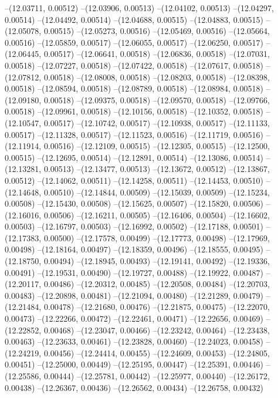 --(12.03711, 0.00512)
--(12.03906, 0.00513)
--(12.04102, 0.00513)
--(12.04297, 0.00514)
--(12.04492, 0.00514)
--(12.04688, 0.00515)
--(12.04883, 0.00515)
--(12.05078, 0.00515)
--(12.05273, 0.00516)
--(12.05469, 0.00516)
--(12.05664, 0.00516)
--(12.05859, 0.00517)
--(12.06055, 0.00517)
--(12.06250, 0.00517)
--(12.06445, 0.00517)
--(12.06641, 0.00518)
--(12.06836, 0.00518)
--(12.07031, 0.00518)
--(12.07227, 0.00518)
--(12.07422, 0.00518)
--(12.07617, 0.00518)
--(12.07812, 0.00518)
--(12.08008, 0.00518)
--(12.08203, 0.00518)
--(12.08398, 0.00518)
--(12.08594, 0.00518)
--(12.08789, 0.00518)
--(12.08984, 0.00518)
--(12.09180, 0.00518)
--(12.09375, 0.00518)
--(12.09570, 0.00518)
--(12.09766, 0.00518)
--(12.09961, 0.00518)
--(12.10156, 0.00518)
--(12.10352, 0.00518)
--(12.10547, 0.00517)
--(12.10742, 0.00517)
--(12.10938, 0.00517)
--(12.11133, 0.00517)
--(12.11328, 0.00517)
--(12.11523, 0.00516)
--(12.11719, 0.00516)
--(12.11914, 0.00516)
--(12.12109, 0.00515)
--(12.12305, 0.00515)
--(12.12500, 0.00515)
--(12.12695, 0.00514)
--(12.12891, 0.00514)
--(12.13086, 0.00514)
--(12.13281, 0.00513)
--(12.13477, 0.00513)
--(12.13672, 0.00512)
--(12.13867, 0.00512)
--(12.14062, 0.00511)
--(12.14258, 0.00511)
--(12.14453, 0.00510)
--(12.14648, 0.00510)
--(12.14844, 0.00509)
--(12.15039, 0.00509)
--(12.15234, 0.00508)
--(12.15430, 0.00508)
--(12.15625, 0.00507)
--(12.15820, 0.00506)
--(12.16016, 0.00506)
--(12.16211, 0.00505)
--(12.16406, 0.00504)
--(12.16602, 0.00503)
--(12.16797, 0.00503)
--(12.16992, 0.00502)
--(12.17188, 0.00501)
--(12.17383, 0.00500)
--(12.17578, 0.00499)
--(12.17773, 0.00498)
--(12.17969, 0.00498)
--(12.18164, 0.00497)
--(12.18359, 0.00496)
--(12.18555, 0.00495)
--(12.18750, 0.00494)
--(12.18945, 0.00493)
--(12.19141, 0.00492)
--(12.19336, 0.00491)
--(12.19531, 0.00490)
--(12.19727, 0.00488)
--(12.19922, 0.00487)
--(12.20117, 0.00486)
--(12.20312, 0.00485)
--(12.20508, 0.00484)
--(12.20703, 0.00483)
--(12.20898, 0.00481)
--(12.21094, 0.00480)
--(12.21289, 0.00479)
--(12.21484, 0.00478)
--(12.21680, 0.00476)
--(12.21875, 0.00475)
--(12.22070, 0.00473)
--(12.22266, 0.00472)
--(12.22461, 0.00471)
--(12.22656, 0.00469)
--(12.22852, 0.00468)
--(12.23047, 0.00466)
--(12.23242, 0.00464)
--(12.23438, 0.00463)
--(12.23633, 0.00461)
--(12.23828, 0.00460)
--(12.24023, 0.00458)
--(12.24219, 0.00456)
--(12.24414, 0.00455)
--(12.24609, 0.00453)
--(12.24805, 0.00451)
--(12.25000, 0.00449)
--(12.25195, 0.00447)
--(12.25391, 0.00446)
--(12.25586, 0.00444)
--(12.25781, 0.00442)
--(12.25977, 0.00440)
--(12.26172, 0.00438)
--(12.26367, 0.00436)
--(12.26562, 0.00434)
--(12.26758, 0.00432)
